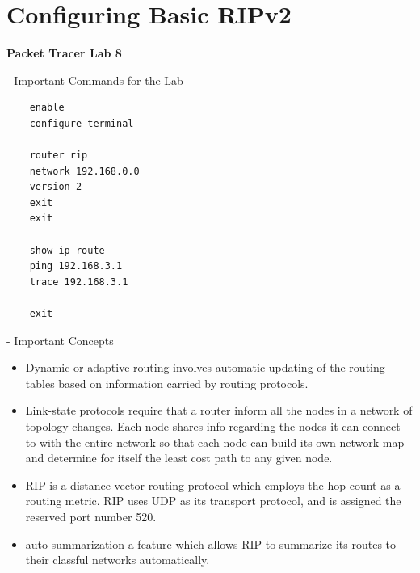 \documentclass[../EngineeringJournal_CDavis.tex]{subfiles}
\begin{document}

\chapter[Configuring Basic RIPv2]{Configuring \linebreak[1] Basic RIPv2 \hspace*{\fill}{Jan 31, 2020}}
\noindent\textbf{{Packet Tracer Lab 8} }                             

\hspace{0.2cm}
\begin{tcolorbox}[width=6.3in]
\scriptsize 
- Important Commands for the Lab
  \begin{verbatim}
    enable
    configure terminal

    router rip
    network 192.168.0.0
    version 2
    exit
    exit

    show ip route
    ping 192.168.3.1
    trace 192.168.3.1

    exit
  \end{verbatim}
- Important Concepts
  \begin{itemize}
    \item{Dynamic or adaptive routing} involves automatic updating of the routing
      tables based on information carried by routing protocols.
    \item{Link-state protocols} require that a router inform all the nodes in
      a network of topology changes. Each node shares info regarding
      the nodes it can connect to with the entire network so that each
      node can build its own network map and determine for itself
      the least cost path to any given node.
    \item{RIP} is a distance vector routing protocol which employs the 
      hop count as a routing metric. RIP uses UDP as its transport protocol,
      and is assigned the reserved port number 520.
    \item{auto summarization} a feature which allows RIP to summarize its
      routes to their classful networks automatically.
  \end{itemize}
\end{tcolorbox}
\hspace{0.2cm}
\normalsize  
\end{document}

